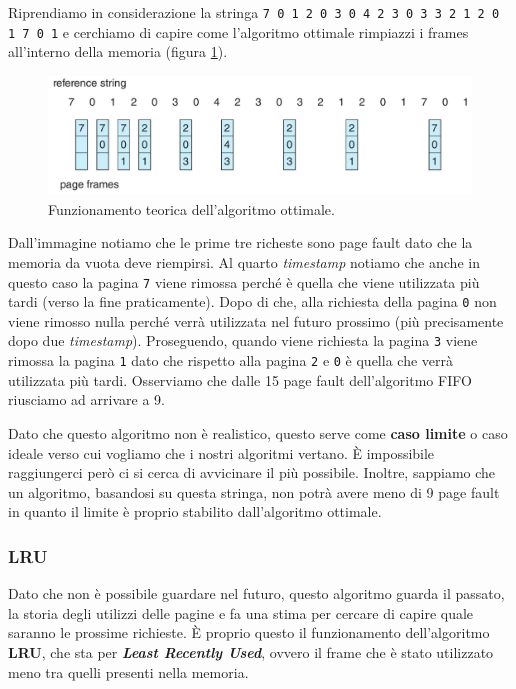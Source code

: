 Riprendiamo in considerazione la stringa \texttt{\small 7 0 1 2 0 3 0 4 2 3 0 3 3 2 1 2 0 1 7 0 1} e cerchiamo di capire come l'algoritmo ottimale rimpiazzi i frames all'interno della memoria (figura \ref{fig:optimal}). 
\begin{figure}[h]
    \centering
    \includegraphics[width = .85\textwidth]{../res/imgs/virtual memory/optimal.png}
    \caption{Funzionamento teorica dell'algoritmo ottimale.}
    \label{fig:optimal}
\end{figure}
Dall'immagine notiamo che le prime tre richeste sono page fault dato che la memoria da vuota deve riempirsi. Al quarto \textit{timestamp} notiamo che anche in questo caso la pagina \texttt{7} viene rimossa perché è quella che viene utilizzata più tardi (verso la fine praticamente). Dopo di che, alla richiesta della pagina \texttt{0} non viene rimosso nulla perché verrà utilizzata nel futuro prossimo (più precisamente dopo due \textit{timestamp}). Proseguendo, quando viene richiesta la pagina \texttt{3} viene rimossa la pagina \texttt{1} dato che rispetto alla pagina \texttt{2} e \texttt{0} è quella che verrà utilizzata più tardi. Osserviamo che dalle 15 page fault dell'algoritmo FIFO riusciamo ad arrivare a 9. 

Dato che questo algoritmo non è realistico, questo serve come \textbf{caso limite} o caso ideale verso cui vogliamo che i nostri algoritmi vertano. È impossibile raggiungerci però ci si cerca di avvicinare il più possibile. Inoltre, sappiamo che un algoritmo, basandosi su questa stringa, non potrà avere meno di 9 page fault in quanto il limite è proprio stabilito dall'algoritmo ottimale.

%
\subsubsection{LRU}
Dato che non è possibile guardare nel futuro, questo algoritmo guarda il passato, la storia degli utilizzi delle pagine e fa una stima per cercare di capire quale saranno le prossime richieste. È proprio questo il funzionamento dell'algoritmo \textbf{LRU}, che sta per \textbf{\textit{Least Recently Used}}, ovvero il frame che è stato utilizzato meno tra quelli presenti nella memoria.

